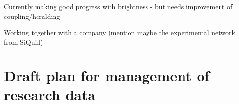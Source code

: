 \documentclass{article}
\theoremstyle{mytheoremstyle}
\theoremstyle{mytheoremstyle}
\theoremstyle{myproblemstyle}
\begin{document}
Currently making good progress with brightness - but needs improvement of coupling/heralding

Working together with a company (mention maybe the experimental network from SiQuid)

\newpage
\section{Draft plan for management of research data}


\end{document}
